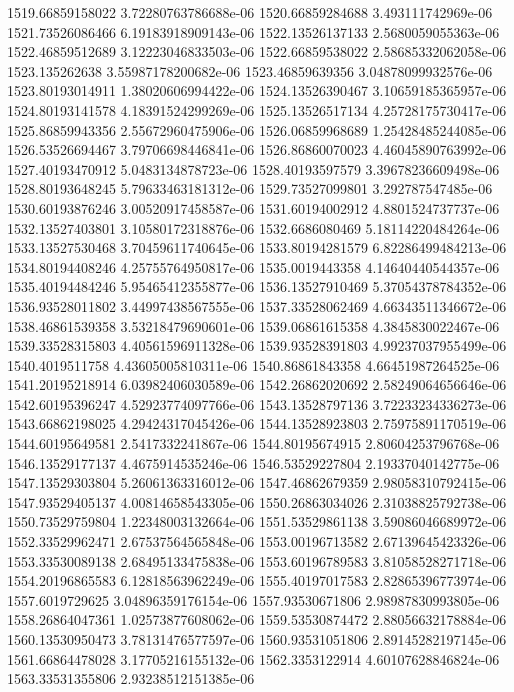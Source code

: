 {1519.66859158022 3.72280763786688e-06
1520.66859284688 3.493111742969e-06
1521.73526086466 6.19183918909143e-06
1522.13526137133 2.5680059055363e-06
1522.46859512689 3.12223046833503e-06
1522.66859538022 2.58685332062058e-06
1523.135262638 3.55987178200682e-06
1523.46859639356 3.04878099932576e-06
1523.80193014911 1.38020606994422e-06
1524.13526390467 3.10659185365957e-06
1524.80193141578 4.18391524299269e-06
1525.13526517134 4.25728175730417e-06
1525.86859943356 2.55672960475906e-06
1526.06859968689 1.25428485244085e-06
1526.53526694467 3.79706698446841e-06
1526.86860070023 4.46045890763992e-06
1527.40193470912 5.0483134878723e-06
1528.40193597579 3.39678236609498e-06
1528.80193648245 5.79633463181312e-06
1529.73527099801 3.292787547485e-06
1530.60193876246 3.00520917458587e-06
1531.60194002912 4.8801524737737e-06
1532.13527403801 3.10580172318876e-06
1532.6686080469 5.18114220484264e-06
1533.13527530468 3.70459611740645e-06
1533.80194281579 6.82286499484213e-06
1534.80194408246 4.25755764950817e-06
1535.0019443358 4.14640440544357e-06
1535.40194484246 5.95465412355877e-06
1536.13527910469 5.37054378784352e-06
1536.93528011802 3.44997438567555e-06
1537.33528062469 4.66343511346672e-06
1538.46861539358 3.53218479690601e-06
1539.06861615358 4.3845830022467e-06
1539.33528315803 4.40561596911328e-06
1539.93528391803 4.99237037955499e-06
1540.4019511758 4.43605005810311e-06
1540.86861843358 4.66451987264525e-06
1541.20195218914 6.03982406030589e-06
1542.26862020692 2.58249064656646e-06
1542.60195396247 4.52923774097766e-06
1543.13528797136 3.72233234336273e-06
1543.66862198025 4.29424317045426e-06
1544.13528923803 2.75975891170519e-06
1544.60195649581 2.5417332241867e-06
1544.80195674915 2.80604253796768e-06
1546.13529177137 4.4675914535246e-06
1546.53529227804 2.19337040142775e-06
1547.13529303804 5.26061363316012e-06
1547.46862679359 2.98058310792415e-06
1547.93529405137 4.00814658543305e-06
1550.26863034026 2.31038825792738e-06
1550.73529759804 1.22348003132664e-06
1551.53529861138 3.59086046689972e-06
1552.33529962471 2.67537564565848e-06
1553.00196713582 2.67139645423326e-06
1553.33530089138 2.68495133475838e-06
1553.60196789583 3.81058528271718e-06
1554.20196865583 6.12818563962249e-06
1555.40197017583 2.82865396773974e-06
1557.6019729625 3.04896359176154e-06
1557.93530671806 2.98987830993805e-06
1558.26864047361 1.02573877608062e-06
1559.53530874472 2.88056632178884e-06
1560.13530950473 3.78131476577597e-06
1560.93531051806 2.89145282197145e-06
1561.66864478028 3.17705216155132e-06
1562.3353122914 4.60107628846824e-06
1563.33531355806 2.93238512151385e-06
}

